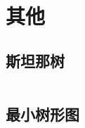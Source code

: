 \documentclass[a4paper]{article}
\newcommand{\cppcode}[1]{
    \inputminted[mathescape,
    frame=lines,linenos]{cpp}{source/#1}
}
\begin{document}









\section{其他}

\subsection{斯坦那树}
\cppcode{miscellany/Steiner-Tree.cpp}

\subsection{最小树形图}
\cppcode{miscellany/mintreegraph.cpp}
\end{document}
